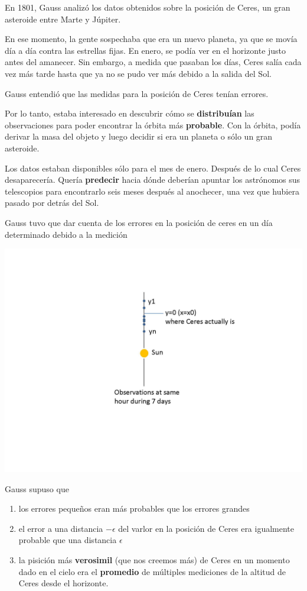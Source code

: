 \documentclass[
]{book}
\begin{document}
En 1801, Gauss analizó los datos obtenidos sobre la posición de Ceres, un gran asteroide entre Marte y Júpiter.

En ese momento, la gente sospechaba que era un nuevo planeta, ya que se movía día a día contra las estrellas fijas. En enero, se podía ver en el horizonte justo antes del amanecer. Sin embargo, a medida que pasaban los días, Ceres salía cada vez más tarde hasta que ya no se pudo ver más debido a la salida del Sol.

Gauss entendió que las medidas para la posición de Ceres tenían errores.

Por lo tanto, estaba interesado en descubrir cómo se \textbf{distribuían} las observaciones para poder encontrar la órbita más \textbf{probable}. Con la órbita, podía derivar la masa del objeto y luego decidir si era un planeta o sólo un gran asteroide.

Los datos estaban disponibles sólo para el mes de enero. Después de lo cual Ceres desaparecería. Quería \textbf{predecir} hacia dónde deberían apuntar los astrónomos sus telescopios para encontrarlo seis meses después al anochecer, una vez que hubiera pasado por detrás del Sol.

Gauss tuvo que dar cuenta de los errores en la posición de ceres en un día determinado debido a la medición

\includegraphics{./figures/ceres.JPG}

Gauss supuso que

\begin{enumerate}
\def\labelenumi{\arabic{enumi})}
\item
  los errores pequeños eran más probables que los errores grandes
\item
  el error a una distancia \(-\epsilon\) del varlor en la posición de Ceres era igualmente probable que una distancia \(\epsilon\)
\item
  la pisición más \textbf{verosimil} (que nos creemos más) de Ceres en un momento dado en el cielo era el \textbf{promedio} de múltiples mediciones de la altitud de Ceres desde el horizonte.
\end{enumerate}
\end{document}
